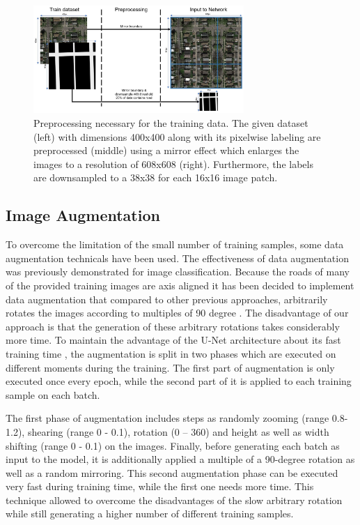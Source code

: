 \documentclass[10pt,conference,compsocconf]{IEEEtran}
\begin{document}
\begin{figure}
\includegraphics[width={8cm}]{preprocessing}
\caption{Preprocessing necessary for the training data. The given dataset (left) with dimensions 400x400 along with its pixelwise labeling are preprocessed (middle) using a mirror effect which enlarges the images to a resolution of 608x608 (right). Furthermore, the labels are downsampled to a 38x38 for each 16x16 image patch.}
\label{fig:preprocessing}
\end{figure}

\subsection{Image Augmentation}

To overcome the limitation of the small number of training samples, some data augmentation technicals have been used. The effectiveness of data augmentation was previously demonstrated \cite{Wang} for image classification. Because the roads of many of the provided training images are axis aligned it has been decided to implement data augmentation that compared to other previous approaches, arbitrarily rotates the images according to multiples of 90 degree \cite{Pavllo2017}. The disadvantage of our approach is that the generation of these arbitrary rotations takes considerably more time. To maintain the advantage of the U-Net architecture about its fast training time \cite{Ronneberger2015}, the augmentation is split in two phases which are executed on different moments during the training. The first part of augmentation is only executed once every epoch, while the second part of it is applied to each training sample on each batch.

The first phase of augmentation includes steps as randomly zooming (range 0.8-1.2), shearing (range 0 - 0.1), rotation (0 – 360) and height as well as width shifting (range 0 - 0.1) on the images. Finally, before generating each batch as input to the model, it is additionally applied a multiple of a 90-degree rotation as well as a random mirroring. This second augmentation phase can be executed very fast during training time, while the first one needs more time. This technique allowed to overcome the disadvantages of the slow arbitrary rotation while still generating a higher number of different training samples.
\end{document}
